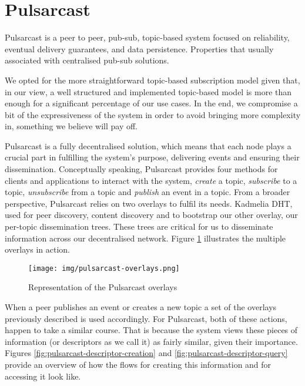 
\section{Pulsarcast}
\label{section:pulsarcast}

Pulsarcast is a peer to peer, pub-sub, topic-based system focused on
reliability, eventual delivery guarantees, and data persistence. Properties
that usually associated with centralised pub-sub solutions. 

We opted for the more straightforward topic-based subscription model given
that, in our view, a well structured and implemented topic-based model is more
than enough for a significant percentage of our use cases. In the end, we
compromise a bit of the expressiveness of the system in order to avoid bringing
more complexity in, something we believe will pay off.

Pulsarcast is a fully decentralised solution, which means that each node plays
a crucial part in fulfilling the system's purpose, delivering events and
ensuring their dissemination. Conceptually speaking, Pulsarcast provides four
methods for clients and applications to interact with the system, \emph{create}
a topic, \emph{subscribe} to a topic, \emph{unsubscribe} from a topic and
\emph{publish} an event in a topic. From a broader perspective, Pulsarcast
relies on two overlays to fulfil its needs. Kadmelia DHT, used for peer
discovery, content discovery and to bootstrap our other overlay, our per-topic
dissemination trees. These trees are critical for us to disseminate information
across our decentralised network.  Figure \ref{fig:pulsarcast-overlays}
illustrates the multiple overlays in action.

\begin{figure}[hb!]
  \centering
  \texttt{[image: img/pulsarcast-overlays.png]}
  \caption{Representation of the Pulsarcast overlays}
  \label{fig:pulsarcast-overlays}
\end{figure}

When a peer publishes an event or creates a new topic a set of the overlays
previously described is used accordingly. For Pulsarcast, both of these
actions, happen to take a similar course. That is because the system views
these pieces of information (or descriptors as we call it) as fairly similar,
given their importance. Figures \ref{fig:pulsarcast-descriptor-creation} and
\ref{fig:pulsarcast-descriptor-query} provide an overview of how the flows for
creating this information and for accessing it look like.

